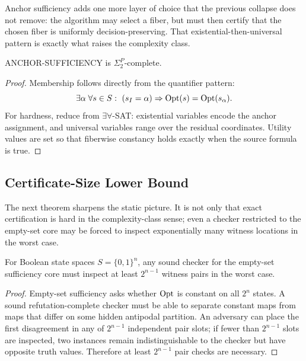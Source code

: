 Anchor sufficiency adds one more layer of choice that the previous collapse does not remove: the algorithm may select a fiber, but must then certify that the chosen fiber is uniformly decision-preserving. That existential-then-universal pattern is exactly what raises the complexity class.

\begin{theorem}\label{thm:anchor-sigma2p}
ANCHOR-SUFFICIENCY is $\Sigma_2^P$-complete.
\end{theorem}


\begin{proof}
Membership follows directly from the quantifier pattern:
\[
\exists\alpha\;\forall s\in S:\ (s_I=\alpha)\Rightarrow \Opt(s)=\Opt(s_\alpha).
\]
For hardness, reduce from $\exists\forall$-SAT: existential variables encode the anchor assignment, and universal variables range over the residual coordinates. Utility values are set so that fiberwise constancy holds exactly when the source formula is true.
\end{proof}

\subsection{Certificate-Size Lower Bound}

The next theorem sharpens the static picture. It is not only that exact certification is hard in the complexity-class sense; even a checker restricted to the empty-set core may be forced to inspect exponentially many witness locations in the worst case.

\begin{theorem}\label{thm:witness-checking-duality}
For Boolean state spaces $S=\{0,1\}^n$, any sound checker for the empty-set sufficiency core must inspect at least $2^{n-1}$ witness pairs in the worst case.
\end{theorem}


\begin{proof}
Empty-set sufficiency asks whether $\mathrm{Opt}$ is constant on all $2^n$ states. A sound refutation-complete checker must be able to separate constant maps from maps that differ on some hidden antipodal partition. An adversary can place the first disagreement in any of $2^{n-1}$ independent pair slots; if fewer than $2^{n-1}$ slots are inspected, two instances remain indistinguishable to the checker but have opposite truth values. Therefore at least $2^{n-1}$ pair checks are necessary.
\end{proof}

